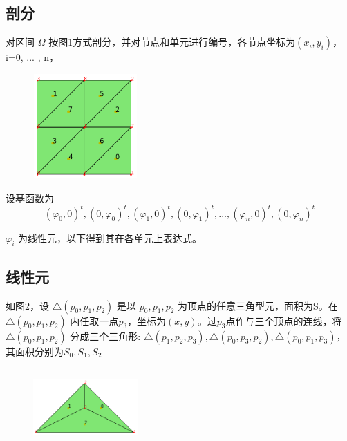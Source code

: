 \documentclass[UTF8,titlepage,twocolumn]{ctexart}
\begin{document}
\subsection{剖分}

对区间 $\Omega$ 按图1方式剖分，并对节点和单元进行编号，各节点坐标为$(x_i,y_i)$， i=0, ... , n，

\begin{figure}[hb]
	\centering
	\includegraphics[height=4cm,width=4cm]{../image/subdivsion.png}
	\caption{}
\end{figure}

设基函数为 
$$ 
(\varphi_0,0)^t, (0,\varphi_0)^t, (\varphi_1,0)^t, (0,\varphi_1)^t, ... , (\varphi_n,0)^t, (0,\varphi_n)^t 
$$

$\varphi_i$ 为线性元，以下得到其在各单元上表达式。 

\subsection{线性元}

如图2，设 $ \bigtriangleup(p_0,p_1,p_2) $ 是以 $p_0,p_1,p_2$ 为顶点的任意三角型元，面积为S。在 $ \bigtriangleup (p_0,p_1,p_2) $ 内任取一点$p_3$，坐标为$(x,y)$。过$p_3$点作与三个顶点的连线，将 $ \bigtriangleup(p_0,p_1,p_2) $ 分成三个三角形: $ \bigtriangleup(p_1,p_2,p_3), \bigtriangleup(p_0,p_3,p_2), \bigtriangleup(p_0,p_1,p_3) $，其面积分别为$S_0,S_1,S_2$

\begin{figure}[hbt]
	\centering
	\includegraphics[height=3cm,width=4cm]{../image/TriangleElement.png}
	\caption{}
	\label{SampleOfDatasets}
\end{figure}
\end{document}
